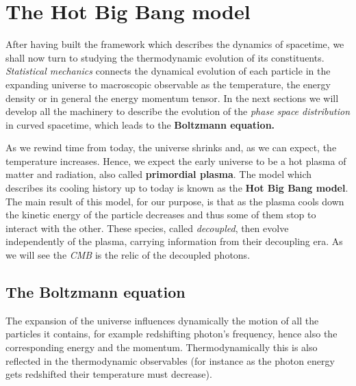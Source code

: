 \chapter{The Hot Big Bang model}\label{chap:HotBigBang}
After having built the framework which describes the dynamics of spacetime, we shall now turn to studying the thermodynamic evolution of its constituents. \emph{Statistical mechanics} connects the dynamical evolution of each particle in the expanding universe to macroscopic observable as the temperature, the energy density or in general the energy momentum tensor. In the next sections we will develop all the machinery to describe the evolution of the \emph{phase space distribution} in curved spacetime, which leads to the \textbf{Boltzmann equation.}

As we rewind time from today, the universe shrinks and, as we can expect, the temperature increases. Hence, we expect the early universe to be a hot plasma of matter and radiation, also called \textbf{primordial plasma}. The model which describes its cooling history up to today is known as the \textbf{Hot Big Bang model}. The main result of this model, for our purpose, is that as the plasma cools down the kinetic energy of the particle decreases and thus some of them stop to interact with the other. These species, called \emph{decoupled}, then evolve independently of the plasma, carrying information from their decoupling era. As we will see the \emph{CMB} is the relic of the decoupled photons. 

\section{The Boltzmann equation}\label{sec:BoltzmannEquation}
The expansion of the universe influences dynamically the motion of all the particles it contains, for example redshifting photon's frequency, hence also the corresponding energy and the momentum. Thermodynamically this is also reflected in the thermodynamic observables (for instance as the photon energy gets redshifted their temperature must decrease). 

